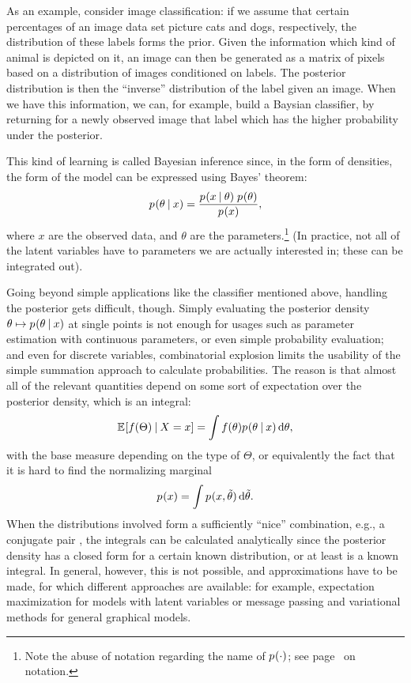 As an example, consider image classification: if we assume that certain percentages of an image data
set picture cats and dogs, respectively, the distribution of these labels forms the prior.  Given
the information which kind of animal is depicted on it, an image can then be generated as a matrix
of pixels based on a distribution of images conditioned on labels.  The posterior distribution is
then the ``inverse'' distribution of the label given an image.  When we have this information, we
can, for example, build a Baysian classifier, by returning for a newly observed image that label
which has the higher probability under the posterior.

This kind of learning is called Bayesian inference since, in the form of densities, the form of the
model can be expressed using Bayes' theorem:
\begin{equation}
  \label{eq:bayes}
  \prob{\theta \given x} = \frac{\prob{x \given \theta}\; \prob{\theta}}{\prob{x}},
\end{equation}
where \(x\) are the observed data, and \(\theta\) are the parameters.\footnote{Note the abuse of
  notation regarding the name of \(\prob{\cdot}\); see page~\pageref{cha:notation} on notation.}  (In
practice, not all of the latent variables have to parameters we are actually interested in; these
can be integrated out).

Going beyond simple applications like the classifier mentioned above, handling the posterior gets
difficult, though.  Simply evaluating the posterior density
\(\theta \mapsto \prob{\theta \given x}\) at single points is not enough for usages such as
parameter estimation with continuous parameters, or even simple probability evaluation; and even for
discrete variables, combinatorial explosion limits the usability of the simple summation approach to
calculate probabilities.  The reason is that almost all of the relevant quantities depend on some
sort of expectation over the posterior density, which is an integral:
\begin{equation}
  \label{eq:posterior-expectation}
  \Exp{f(\Theta) \given X = x} = \int f(\theta) \prob{\theta \given x} \dif \theta,
\end{equation}
with the base measure depending on the type of \(\Theta\), or equivalently the fact that it is hard
to find the normalizing marginal
\begin{equation}
  \label{eq:normalizing}
  \prob{x} = \int \prob{x, \tilde{\theta}} \dif \tilde{\theta}.
\end{equation}
When the distributions involved form a sufficiently \enquote{nice} combination, e.g., a conjugate
pair , the integrals can be calculated analytically since the posterior density has a
closed form for a certain known distribution, or at least is a known integral.  In general, however,
this is not possible, and approximations have to be made, for which different approaches are
available: for example, expectation maximization for models with latent variables or
message passing and variational methods for general graphical models.

